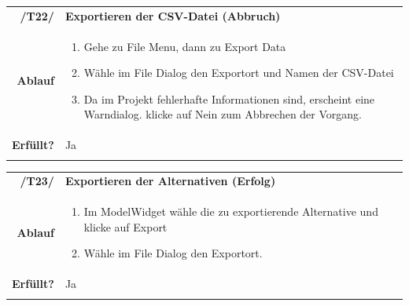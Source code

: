 \documentclass{article}
\begin{document}
\begin{table}[H]
\begin{tabularx}{\textwidth}{rX}
\vspace{1mm}
\textbf{/T22/}         & \textbf{Exportieren der CSV-Datei (Abbruch)} \\ \vspace{1mm}
\textbf{Ablauf} & 
\begin{enumerate}
        \item Gehe zu File Menu, dann zu Export Data
        \item Wähle im File Dialog den Exportort und Namen der CSV-Datei
        \item Da im Projekt fehlerhafte Informationen sind, erscheint eine Warndialog. klicke auf Nein zum Abbrechen der Vorgang.
    \end{enumerate} \\ \vspace{1mm}
\textbf{Erfüllt?}  & Ja \\ \vspace{1mm}
\end{tabularx}
\end{table}

\begin{table}[H]
\begin{tabularx}{\textwidth}{rX}
\vspace{1mm}
\textbf{/T23/}         & \textbf{Exportieren der Alternativen (Erfolg)} \\ \vspace{1mm}
\textbf{Ablauf} & 
\begin{enumerate}
        \item Im ModelWidget wähle die zu exportierende Alternative und klicke auf Export
        \item Wähle im File Dialog den Exportort.
    \end{enumerate} \\ \vspace{1mm}
\textbf{Erfüllt?}  &  Ja\\ \vspace{1mm}
\end{tabularx}
\end{table}
\end{document}
